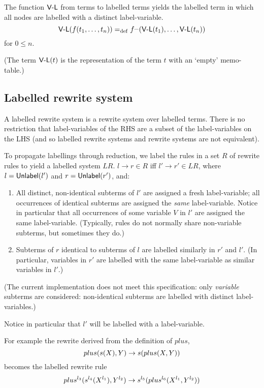 \begin{defn}[\TICK]
The function $\mbox{\sf V-L}$ from terms to labelled terms yields the labelled term in
which all nodes are labelled with a distinct label-variable.
\[
\mbox{\sf V-L}(f(t_1,\ldots,t_n)) =_{\rm def} f^{\_}(\mbox{\sf V-L}(t_1),\ldots,\mbox{\sf V-L}(t_n))
\]
for $0\leq n$.
\end{defn}
(The term $\mbox{\sf V-L}(t)$ is the representation of the term $t$ with an
`empty' memo-table.)

\subsection {Labelled rewrite system}
A labelled rewrite system is a rewrite system over labelled terms.
There is no restriction that label-variables of the RHS are a subset
of the label-variables on the LHS (and so labelled rewrite systems and 
rewrite systems are not equivalent).

To propagate labellings through reduction, we label the rules in a set
$R$ of rewrite rules to yield a labelled system $LR$.  $l\rightarrow
r\in R$ iff $l'\rightarrow r'\in LR$, where $l=\mbox{\sf Unlabel}(l')$ and
$r=\mbox{\sf Unlabel}(r')$, and:

\begin{enumerate}
\item
All distinct, non-identical subterms of $l'$ are assigned a fresh
label-variable; all occurrences of identical subterms are assigned the
{\em same\/} label-variable.  Notice in particular that all
occurrences of some variable $V$ in $l'$ are assigned the same
label-variable.  (Typically, rules do not normally share non-variable
subterms, but sometimes they do.)

\item Subterms of $r$ identical to subterms of $l$ are labelled
similarly in $r'$ and $l'$. (In particular, variables in $r'$ are
labelled with the same label-variable as similar variables in $l'$.)
\end{enumerate}
(The current \clam implementation does not meet this specification:
only {\em variable\/} subterms are considered: non-identical subterms
are labelled with distinct label-variables.)

Notice in particular that $l'$ will be labelled with a
label-variable. 


For example the rewrite derived from the definition of $plus$,
\[plus(s(X),Y) \rightarrow s(plus(X,Y))\] becomes the labelled rewrite rule
\[plus^{l_3}(s^{l_4}(X^{l_1}),Y^{l_2}) \rightarrow s^{l_5}(plus^{l_6}(X^{l_1},Y^{l_2}))\]

